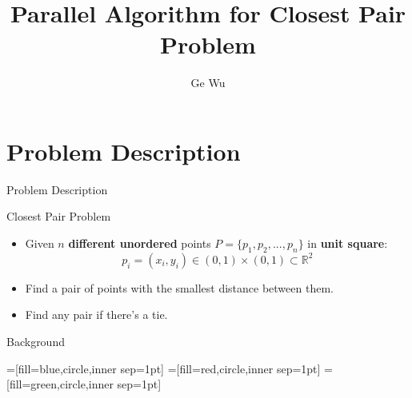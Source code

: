 \documentclass[18pt]{beamer}
\title[Parallel Algorithm for Closest Pair Problem]{Parallel Algorithm for Closest Pair Problem}
\subtitle{}
\author{Ge Wu}
\institute{Institute for Theoretical Informatics}
\begin{document}

\begin{frame}
\titlepage
\end{frame}


\section{Problem Description}

\begin{frame}{Problem Description}
\begin{block}{Closest Pair Problem}
\begin{itemize}
\item Given $n$ \textbf{different unordered} points $P = \{p_1,p_2, ... ,p_n\}$ in \textbf{unit square}: \\
$$p_i = (x_i, y_i) \in (0, 1) \times (0,1) \subset \mathbb{R}^2$$
\item Find a pair of points with the smallest distance between them.
\item Find any pair if there's a tie.
\end{itemize}
\end{block}
\end{frame}

\begin{frame}{Background}

\end{frame}

=[fill=blue,circle,inner sep=1pt]
=[fill=red,circle,inner sep=1pt]
=[fill=green,circle,inner sep=1pt]
\end{document}
